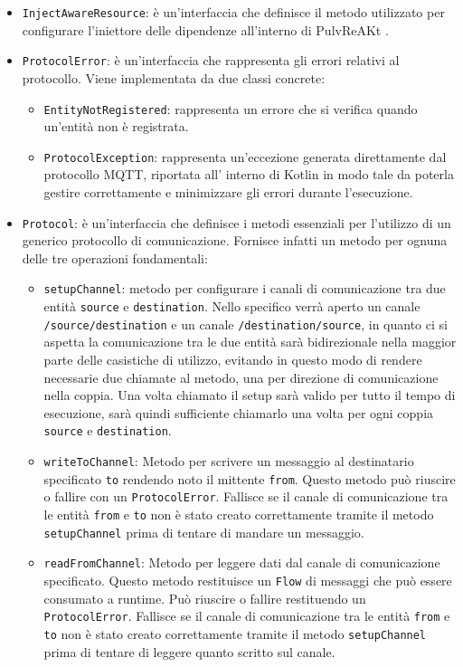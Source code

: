 \documentclass[12pt,a4paper,openright,twoside]{book}
\begin{document}
\begin{itemize}
    \item \texttt{InjectAwareResource}: è un'interfaccia che definisce il metodo utilizzato per configurare l'iniettore delle dipendenze all'interno di PulvReAKt .

    \item \texttt{ProtocolError}: è un'interfaccia che rappresenta gli errori relativi al protocollo. Viene implementata da due classi concrete:
    \begin{itemize}
        \item \texttt{EntityNotRegistered}: rappresenta un errore che si verifica quando un'entità non è registrata.
        \item \texttt{ProtocolException}: rappresenta un'eccezione generata direttamente dal protocollo \ac{MQTT}, riportata all' interno di Kotlin 
        in modo tale da poterla gestire correttamente e minimizzare gli errori durante l'esecuzione.
    \end{itemize}

    \item \texttt{Protocol}: è un'interfaccia che definisce i metodi essenziali per l'utilizzo di un generico protocollo di comunicazione. 
    Fornisce infatti un metodo per ognuna delle tre operazioni fondamentali:
    \begin{itemize}
        \item \texttt{setupChannel}: metodo per configurare i canali di comunicazione tra due entità \texttt{source} e \texttt{destination}. 
        Nello specifico verrà aperto un canale \texttt{/source/destination} e un canale \texttt{/destination/source}, 
        in quanto ci si aspetta la comunicazione tra le due entità sarà bidirezionale nella maggior parte delle casistiche di utilizzo, 
        evitando in questo modo di rendere necessarie due chiamate al metodo, una per direzione di comunicazione nella coppia.
        Una volta chiamato il setup sarà valido per tutto il tempo di esecuzione, sarà quindi sufficiente chiamarlo una volta per ogni coppia 
        \texttt{source} e \texttt{destination}.
        \item \texttt{writeToChannel}: Metodo per scrivere un messaggio al destinatario specificato \texttt{to} rendendo noto il mittente \texttt{from}. 
        Questo metodo può riuscire o fallire con un \texttt{ProtocolError}. Fallisce se il canale di comunicazione tra le entità \texttt{from} e \texttt{to}
        non è stato creato correttamente tramite il metodo \texttt{setupChannel} prima di tentare di mandare un messaggio.
        \item \texttt{readFromChannel}: Metodo per leggere dati dal canale di comunicazione specificato. Questo metodo restituisce un \texttt{Flow} 
        di messaggi che può essere consumato a runtime. Può riuscire o fallire restituendo un \texttt{ProtocolError}. 
        Fallisce se il canale di comunicazione tra le entità \texttt{from} e \texttt{to}
        non è stato creato correttamente tramite il metodo \texttt{setupChannel} prima di tentare di leggere quanto scritto sul canale.
    \end{itemize}


\end{itemize}
\end{document}
